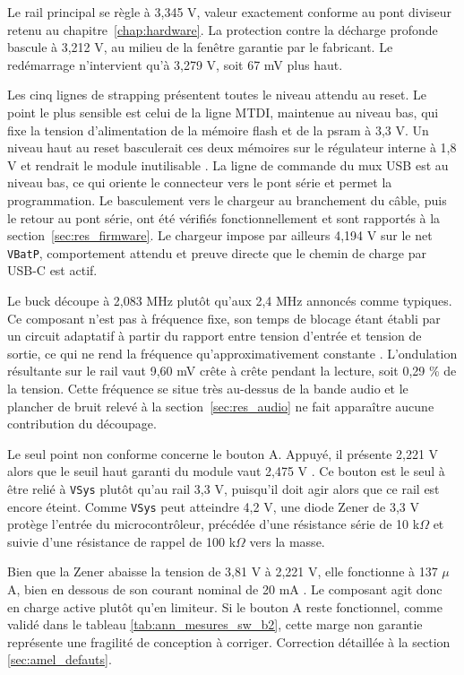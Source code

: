 Le rail principal se règle à 3,345 V, valeur exactement conforme au pont diviseur retenu au chapitre~\ref{chap:hardware}. La protection contre la décharge profonde bascule à 3,212 V, au milieu de la fenêtre garantie par le fabricant. Le redémarrage n'intervient qu'à 3,279 V, soit 67 mV plus haut.

Les cinq lignes de \gls{strapping} présentent toutes le niveau attendu au reset. Le point le plus sensible est celui de la ligne MTDI, maintenue au niveau bas, qui fixe la tension d'alimentation de la mémoire flash et de la \gls{psram} à 3,3 V. Un niveau haut au reset basculerait ces deux mémoires sur le régulateur interne à 1,8 V et rendrait le module inutilisable \cite{ESP32_Datasheet}. La ligne de commande du mux USB est au niveau bas, ce qui oriente le connecteur vers le pont série et permet la programmation. Le basculement vers le chargeur au branchement du câble, puis le retour au pont série, ont été vérifiés fonctionnellement et sont rapportés à la section~\ref{sec:res_firmware}. Le chargeur impose par ailleurs 4,194 V sur le net \texttt{VBatP}, comportement attendu et preuve directe que le chemin de charge par USB-C est actif.

Le buck découpe à 2,083 MHz plutôt qu'aux 2,4 MHz annoncés comme typiques. Ce composant n'est pas à fréquence fixe, son temps de blocage étant établi par un circuit adaptatif à partir du rapport entre tension d'entrée et tension de sortie, ce qui ne rend la fréquence qu'approximativement constante \cite{TI_TPS62A01}. L'ondulation résultante sur le rail vaut 9,60 mV crête à crête pendant la lecture, soit 0,29 \% de la tension. Cette fréquence se situe très au-dessus de la bande audio et le plancher de bruit relevé à la section~\ref{sec:res_audio} ne fait apparaître aucune contribution du découpage.

Le seul point non conforme concerne le bouton A. Appuyé, il présente 2,221 V alors que le seuil haut garanti du module vaut 2,475 V \cite{ESP32_WROVER-E_Datasheet}. Ce bouton est le seul à être relié à \texttt{VSys} plutôt qu'au rail 3,3 V, puisqu'il doit agir alors que ce rail est encore éteint. Comme \texttt{VSys} peut atteindre 4,2 V, une diode Zener de 3,3 V protège l'entrée du microcontrôleur, précédée d'une résistance série de 10 k$\Omega$ et suivie d'une résistance de rappel de 100 k$\Omega$ vers la masse.

Bien que la Zener abaisse la tension de 3,81 V à 2,221 V, elle fonctionne à 137 $\mu$A, bien en dessous de son courant nominal de 20 mA \cite{onsemi_MMSZ5226BT1G}. Le composant agit donc en charge active plutôt qu'en limiteur. Si le bouton A reste fonctionnel, comme validé dans le tableau \ref{tab:ann_mesures_sw_b2}, cette marge non garantie représente une fragilité de conception à corriger. Correction détaillée à la section \ref{sec:amel_defauts}.


